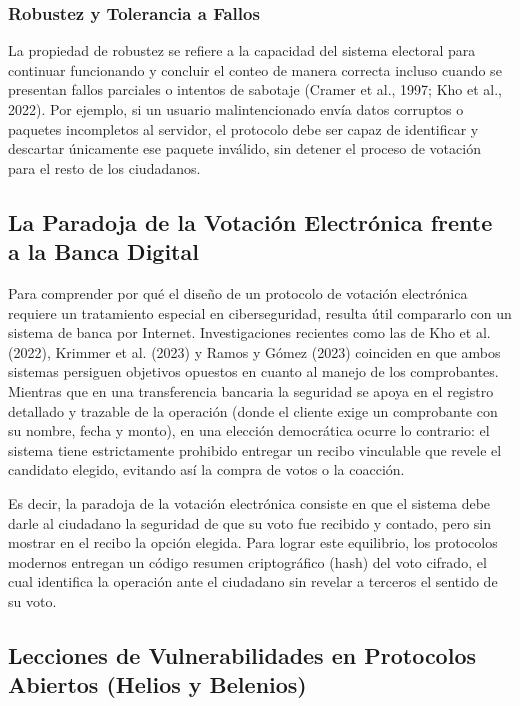 \subsubsection{Robustez y Tolerancia a Fallos}

La propiedad de robustez se refiere a la capacidad del sistema electoral para continuar funcionando y concluir el conteo de manera correcta incluso cuando se presentan fallos parciales o intentos de sabotaje (Cramer et al., 1997; Kho et al., 2022). Por ejemplo, si un usuario malintencionado envía datos corruptos o paquetes incompletos al servidor, el protocolo debe ser capaz de identificar y descartar únicamente ese paquete inválido, sin detener el proceso de votación para el resto de los ciudadanos.

\subsection{La Paradoja de la Votación Electrónica frente a la Banca Digital}

Para comprender por qué el diseño de un protocolo de votación electrónica requiere un tratamiento especial en ciberseguridad, resulta útil compararlo con un sistema de banca por Internet. Investigaciones recientes como las de Kho et al. (2022), Krimmer et al. (2023) y Ramos y Gómez (2023) coinciden en que ambos sistemas persiguen objetivos opuestos en cuanto al manejo de los comprobantes. Mientras que en una transferencia bancaria la seguridad se apoya en el registro detallado y trazable de la operación (donde el cliente exige un comprobante con su nombre, fecha y monto), en una elección democrática ocurre lo contrario: el sistema tiene estrictamente prohibido entregar un recibo vinculable que revele el candidato elegido, evitando así la compra de votos o la coacción.

Es decir, la paradoja de la votación electrónica consiste en que el sistema debe darle al ciudadano la seguridad de que su voto fue recibido y contado, pero sin mostrar en el recibo la opción elegida. Para lograr este equilibrio, los protocolos modernos entregan un código resumen criptográfico (hash) del voto cifrado, el cual identifica la operación ante el ciudadano sin revelar a terceros el sentido de su voto.

\subsection{Lecciones de Vulnerabilidades en Protocolos Abiertos (Helios y Belenios)}

